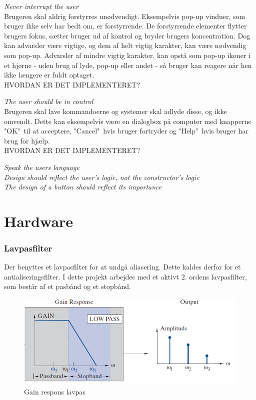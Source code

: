 \textit{Never interrupt the user}\\
Brugeren skal aldrig forstyrres unødvendigt. Eksempelvis pop-up vinduer, som bruger ikke selv har bedt om, er forstyrrende. De forstyrrende elementer flytter brugers fokus, sætter bruger ud af kontrol og bryder brugers koncentration. Dog kan advarsler være vigtige, og dem af helt vigtig karakter, kan være nødvendig som pop-up. Advarsler af mindre vigtig karakter, kan opstå som pop-up ikoner i et hjørne - uden brug af lyde, pop-up eller andet - så bruger kan reagere når hen ikke længere er fuldt optaget.\\
HVORDAN ER DET IMPLEMENTERET?

\textit{The user should be in control}\\
Brugeren skal lave kommandoerne og systemer skal adlyde disse, og ikke omvendt. Dette kan eksempelvis være en dialogbox på computer med knapperne "OK"\ til at acceptere, "Cancel"\ hvis bruger fortryder og "Help"\ hvis bruger har brug for hjælp.\\
HVORDAN ER DET IMPLEMENTERET?

\textit{Speak the users language}\\


\textit{Design should reflect the user's logic, not the constructor's logic}\\
\newline
\textit{The design of a button should reflect its importance}\\
\newline

  
    

\section{Hardware}
\subsubsection{Lavpasfilter}
Der benyttes et lavpasfilter for at undgå aliasering. Dette kaldes derfor for et antialiseringsfilter.
I dette projekt arbejdes med et aktivt 2. ordens lavpasfilter, som består af et pasbånd og et stopbånd. 

\begin{figure}[H]
\centering
\includegraphics[scale=0.50]{lavpas.PNG}
\caption{Gain respons lavpas}
\end{figure}

